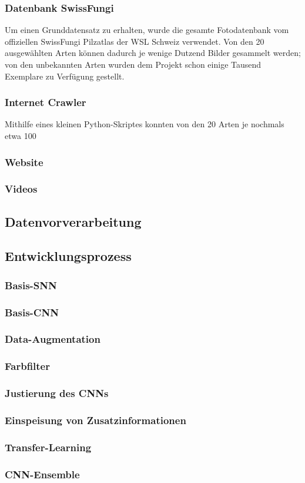 \subsubsection{Datenbank SwissFungi}
Um einen Grunddatensatz zu erhalten, wurde die gesamte Fotodatenbank vom offiziellen SwissFungi Pilzatlas der WSL Schweiz verwendet\cite{wsl}. Von den 20 ausgewählten Arten können dadurch je wenige Dutzend Bilder gesammelt werden; von den unbekannten Arten wurden dem Projekt schon einige Tausend Exemplare zu Verfügung gestellt.

\subsubsection{Internet Crawler}
Mithilfe eines kleinen Python-Skriptes konnten von den 20 Arten je nochmals etwa 100 

\subsubsection{Website}


\subsubsection{Videos}

\subsection{Datenvorverarbeitung}


\subsection{Entwicklungsprozess}\label{cha:met:dev}

\subsubsection{Basis-SNN}

\subsubsection{Basis-CNN}

\subsubsection{Data-Augmentation}

\subsubsection{Farbfilter}

\subsubsection{Justierung des CNNs}

\subsubsection{Einspeisung von Zusatzinformationen}

\subsubsection{Transfer-Learning}

\subsubsection{CNN-Ensemble}